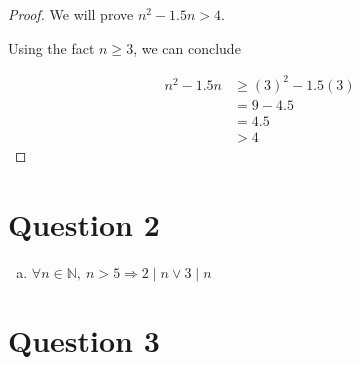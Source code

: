\documentclass[12pt]{article}
\begin{document}
\begin{enumerate}[a.]
\begin{proof}
        \bigskip

        We will prove $n^2 - 1.5n > 4$.

        \bigskip

        Using the fact $n \geq 3$, we can conclude

        \setcounter{equation}{0}
        \begin{align}
            n^2 - 1.5n &\geq (3)^2 - 1.5(3)\\
            &= 9 - 4.5\\
            &= 4.5\\
            &> 4
        \end{align}
    \end{proof}

\end{enumerate}

\section*{Question 2}
\begin{enumerate}[a.]
    \item $\forall n \in \mathbb{N},\:n > 5 \Rightarrow 2 \mid n \lor 3 \mid n$
\end{enumerate}

\section*{Question 3}
\end{document}
